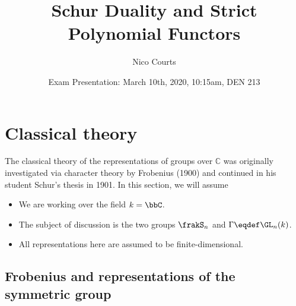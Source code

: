 \documentclass[12pt]{article}
\begin{document}
\title{Schur Duality and Strict Polynomial Functors}
\author{Nico Courts}
\date{Exam Presentation: March 10th, 2020, 10:15am, DEN 213}
\maketitle

\setcounter{tocdepth}{2}
\tableofcontents

\newpage

\section{Classical theory}
	The classical theory of the representations of groups over $\mathbb C$ was originally investigated 
	via character theory by Frobenius \cite{frobenius-charaktere} (1900) and continued in his student Schur's thesis \cite{schur-thesis} in 1901.
	In this section, we will assume 
	\begin{itemize}
		\item We are working over the field $k=\bbC$.
		\item The subject of discussion is the two groups $\frakS_n$ and $\Gamma\eqdef\GL_n(k)$.
		\item All representations here are assumed to be finite-dimensional.
	\end{itemize}
	\subsection{Frobenius and representations of the symmetric group}
\end{document}
